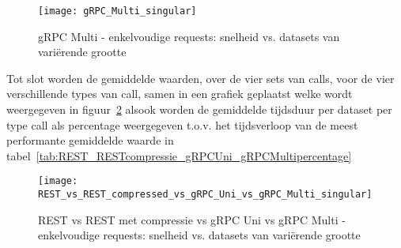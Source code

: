 \begin{figure}[ht]
    \centering
    \texttt{[image: gRPC\_Multi\_singular]}
    \caption{gRPC Multi - enkelvoudige requests: snelheid vs. datasets van vari\"erende grootte}
    \label{fig:gRPCMultienkelvoudig}
\end{figure}

Tot slot worden de gemiddelde waarden, over de vier sets van calls, voor de vier verschillende types van call, samen in een grafiek geplaatst
welke wordt weergegeven in figuur~\ref{fig:RESTRESTcompressiegRPCUnigRPCMulti} alsook worden de gemiddelde tijdsduur per dataset per type call
als percentage weergegeven t.o.v. het tijdsverloop van de meest performante gemiddelde waarde in tabel~\ref{tab:REST_RESTcompressie_gRPCUni_gRPCMultipercentage}\\
\begin{figure}[ht]
    \centering
    \texttt{[image: REST\_vs\_REST\_compressed\_vs\_gRPC\_Uni\_vs\_gRPC\_Multi\_singular]}
    \caption{REST vs REST met compressie vs gRPC Uni vs gRPC Multi - enkelvoudige requests: snelheid vs. datasets van vari\"erende grootte}
    \label{fig:RESTRESTcompressiegRPCUnigRPCMulti}
\end{figure}

